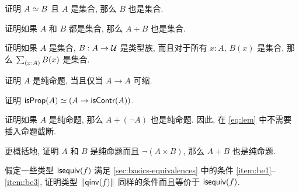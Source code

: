 \begin{ex}
    \label{ex:equiv-functor-set}
    证明 $A \simeq B$ 且 $A$ 是集合, 那么 $B$ 也是集合.
\end{ex}

\begin{ex}
    \label{ex:isset-coprod}
    证明如果 $A$ 和 $B$ 都是集合, 那么 $A+B$ 也是集合.
\end{ex}

\begin{ex}
    \label{ex:isset-sigma}
    证明如果 $A$ 是集合, $B:A\to \mathcal{U}$ 是类型族, 而且对于所有 $x:A$, $B(x)$ 是集合, 那么 $\sm{x:A} B(x)$ 是集合.
\end{ex}

\begin{ex}
    \label{ex:prop-endocontr}
    证明 $A$ 是纯命题, 当且仅当 $A\to A$ 可缩.
\end{ex}

\begin{ex}
    \label{ex:prop-inhabcontr}
    证明 $\mathsf{isProp}(A) \simeq (A\to\mathsf{isContr}(A))$.
\end{ex}

\begin{ex}
    \label{ex:lem-mereprop}
    证明如果 $A$ 是纯命题, 那么 $A+(\neg A)$ 也是纯命题.
    因此, 在 \eqref{eq:lem} 中不需要插入命题截断.
\end{ex}

\begin{ex}
    \label{ex:disjoint-or}
    更概括地, 证明 $A$ 和 $B$ 是纯命题而且 $\neg(A\times B)$, 那么 $A+B$ 也是纯命题.
\end{ex}




\begin{ex}
    \label{ex:brck-qinv}
    假定一些类型 $\mathsf{isequiv}(f)$ 满足 \cref{sec:basics-equivalences} 中的条件 \ref{item:be1}--\ref{item:be3}, 证明类型 $\mathopen{}\left\Vert \mathsf{qinv}(f)\right\Vert_{}\mathclose{}$ 同样的条件而且等价于 $\mathsf{isequiv}(f)$.
\end{ex}

